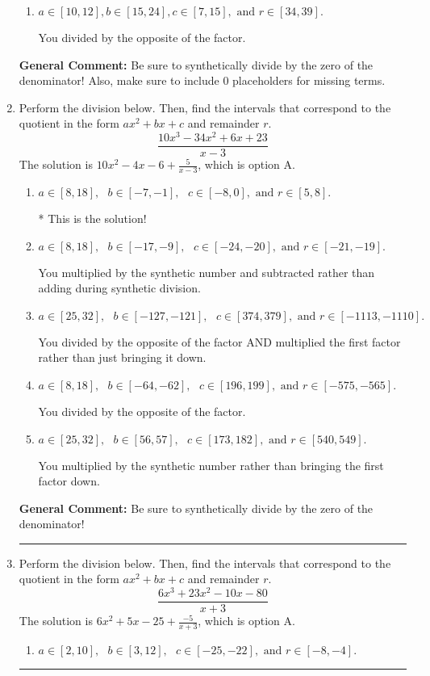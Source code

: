 \documentclass{extbook}[14pt]
\newcommand{\litem}[1]{\item #1

\rule{\textwidth}{0.4pt}}
\begin{document}
\begin{enumerate}
{\begin{enumerate}[label=\Alph*.]
* This is the solution!
\item \( a \in [10, 12], b \in [15, 24], c \in [7, 15], \text{ and } r \in [34, 39]. \)

 You divided by the opposite of the factor.
\end{enumerate}

\textbf{General Comment:} Be sure to synthetically divide by the zero of the denominator! Also, make sure to include 0 placeholders for missing terms.
}
\litem{
Perform the division below. Then, find the intervals that correspond to the quotient in the form $ax^2+bx+c$ and remainder $r$.
\[ \frac{10x^{3} -34 x^{2} +6 x + 23}{x -3} \]The solution is \( 10x^{2} -4 x -6 + \frac{5}{x -3} \), which is option A.\begin{enumerate}[label=\Alph*.]
\item \( a \in [8, 18], \text{   } b \in [-7, -1], \text{   } c \in [-8, 0], \text{   and   } r \in [5, 8]. \)

* This is the solution!
\item \( a \in [8, 18], \text{   } b \in [-17, -9], \text{   } c \in [-24, -20], \text{   and   } r \in [-21, -19]. \)

 You multiplied by the synthetic number and subtracted rather than adding during synthetic division.
\item \( a \in [25, 32], \text{   } b \in [-127, -121], \text{   } c \in [374, 379], \text{   and   } r \in [-1113, -1110]. \)

 You divided by the opposite of the factor AND multiplied the first factor rather than just bringing it down.
\item \( a \in [8, 18], \text{   } b \in [-64, -62], \text{   } c \in [196, 199], \text{   and   } r \in [-575, -565]. \)

 You divided by the opposite of the factor.
\item \( a \in [25, 32], \text{   } b \in [56, 57], \text{   } c \in [173, 182], \text{   and   } r \in [540, 549]. \)

 You multiplied by the synthetic number rather than bringing the first factor down.
\end{enumerate}

\textbf{General Comment:} Be sure to synthetically divide by the zero of the denominator!
}
\litem{
Perform the division below. Then, find the intervals that correspond to the quotient in the form $ax^2+bx+c$ and remainder $r$.
\[ \frac{6x^{3} +23 x^{2} -10 x -80}{x + 3} \]The solution is \( 6x^{2} +5 x -25 + \frac{-5}{x + 3} \), which is option A.\begin{enumerate}[label=\Alph*.]
\item \( a \in [2, 10], \text{   } b \in [3, 12], \text{   } c \in [-25, -22], \text{   and   } r \in [-8, -4]. \)


\end{enumerate}}
\end{enumerate}
\end{document}
